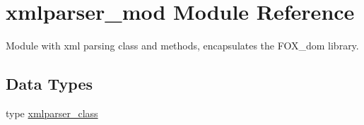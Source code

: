 \hypertarget{namespacexmlparser__mod}{}\section{xmlparser\+\_\+mod Module Reference}
\label{namespacexmlparser__mod}


Module with xml parsing class and methods, encapsulates the F\+O\+X\+\_\+dom library.  


\subsection*{Data Types}
\begin{DoxyCompactItemize}
\item 
type \mbox{\hyperlink{structxmlparser__mod_1_1xmlparser__class}{xmlparser\+\_\+class}}
\end{DoxyCompactItemize}

